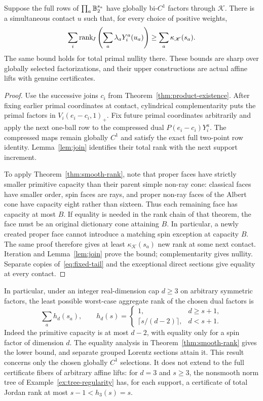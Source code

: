 \begin{theorem}\label{thm:smooth-product-rank}
Suppose the full rows of $\prod_a\mathbb B_2^{s_a}$ have globally bi-$C^1$
factors through $\mathscr K$. There is a simultaneous contact $u$ such
that, for every choice of positive weights,
\begin{equation}\label{eq:smooth-product-rank}
 \sum_i\operatorname{rank}_{\!J}\left(\sum_a\lambda_aY_i^a(u_a)\right)
 \geq\sum_a\kappa_{\mathscr K}(s_a).
\end{equation}
The same bound holds for total primal nullity there. These bounds are
sharp over globally selected factorizations, and their upper constructions
are actual affine lifts with genuine certificates.
\end{theorem}
\begin{proof}
Use the successive joins $c_i$ from Theorem~\ref{thm:product-existence}.
After fixing earlier primal coordinates at contact, cylindrical
complementarity puts the primal factors in $V_i(e_i-c_i,1)_+$.
Fix future primal coordinates arbitrarily and apply the next one-ball
row to the compressed dual $P(e_i-c_i)Y_i^a$. The compressed maps remain
globally $C^1$ and satisfy the exact full two-point row identity.
Lemma~\ref{lem:join} identifies their total rank with the next support
increment.

To apply Theorem~\ref{thm:smooth-rank}, note that proper faces have
strictly smaller primitive capacity than their parent simple non-ray
cone: classical faces have smaller order, spin faces are rays, and
proper non-ray faces of the Albert cone have capacity eight rather than
sixteen.
Thus each remaining face has capacity at most $B$. If equality is
needed in the rank chain of that theorem, the face must be an original
dictionary cone attaining $B$. In particular, a newly created proper face
cannot introduce a matching spin exception at capacity $B$. The same
proof therefore gives at least $\kappa_{\mathscr K}(s_a)$ new rank at
some next contact. Iteration and Lemma~\ref{lem:join} prove the bound;
complementarity gives nullity. Separate copies of~\eqref{eq:fixed-tail}
and the exceptional direct sections give equality at every contact.
\end{proof}

In particular, under an integer real-dimension cap $d\geq3$ on arbitrary symmetric
factors, the least possible worst-case aggregate rank of the chosen
dual factors is
\[
 \sum_a h_d(s_a),\qquad
 h_d(s)=\begin{cases}1,&d\geq s+1,\\
 \lceil s/(d-2)\rceil,&d<s+1.
 \end{cases}
\]
Indeed the primitive capacity is at most $d-2$, with equality only for a
spin factor of dimension $d$. The equality analysis in
Theorem~\ref{thm:smooth-rank} gives the lower bound, and separate grouped
Lorentz sections attain it. This result concerns only the chosen globally
$C^1$ selections. It does not extend to the full certificate fibers of
arbitrary affine lifts: for $d=3$ and $s\geq3$, the nonsmooth norm tree
of Example~\ref{ex:tree-regularity} has, for each support, a
certificate of total Jordan rank at most $s-1<h_3(s)=s$.

